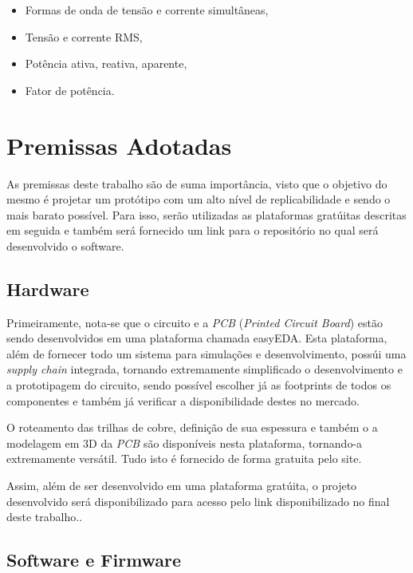 \begin{itemize}
    \item Formas de onda de tensão e corrente simultâneas,
    \item Tensão e corrente RMS,
    \item Potência ativa, reativa, aparente,
    \item Fator de potência.
\end{itemize}

\section{Premissas Adotadas}\label{premissas1}

As premissas deste trabalho são de suma importância, visto que o objetivo do mesmo é projetar um protótipo com um alto nível de replicabilidade e sendo o mais barato possível. Para isso, serão utilizadas as plataformas gratúitas descritas em seguida e também será fornecido um link para o repositório no qual será desenvolvido o software.

\subsection{Hardware}\label{proto}

Primeiramente, nota-se que o circuito e a \textit{\gls{PCB}} (\textit{Printed Circuit Board}) estão sendo desenvolvidos em uma plataforma chamada easyEDA. Esta plataforma, além de fornecer todo um sistema para simulações e desenvolvimento, possúi uma \textit{supply chain} integrada, tornando extremamente simplificado o desenvolvimento e a prototipagem do circuito, sendo possível escolher já as footprints de todos os componentes e também já verificar a disponibilidade destes no mercado.

O roteamento das trilhas de cobre, definição de sua espessura e também o a modelagem em 3D da \textit{\gls{PCB}} são disponíveis nesta plataforma, tornando-a extremamente versátil. Tudo isto é fornecido de forma gratuita pelo site.

Assim, além de ser desenvolvido em uma plataforma gratúita, o projeto desenvolvido será disponibilizado para acesso pelo link disponibilizado no final deste trabalho..

\subsection{Software e Firmware}\label{softw}

